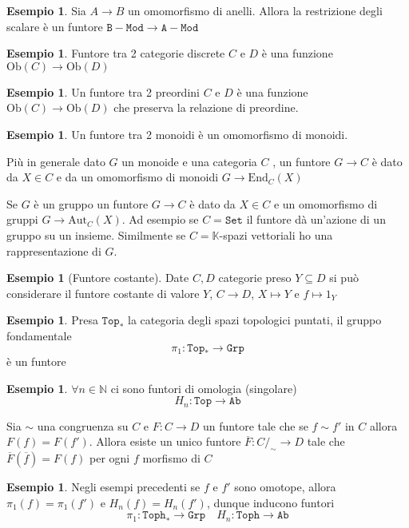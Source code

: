 \documentclass[notitlepage]{report}
\newcounter{theo}[section]\setcounter{theo}{0}
\newcounter{excounter}[section]\setcounter{excounter}{0}
\numberwithin{equation}{section}
\theoremstyle{plain}
\theoremstyle{definition}
\newtheorem{example}[excounter]{Esempio}
\theoremstyle{remark}
\begin{document}
\begin{example}{}
    Sia \(A \to B\) un omomorfismo di anelli. Allora la restrizione degli
    scalare è un funtore \(\mathtt{B-Mod} \to \mathtt{A-Mod}\) 
\end{example}


\begin{example}{}
    Funtore tra 2 categorie discrete \(C\) e \(D\) è una funzione \(\mathrm{Ob}{(C)} \to \mathrm{Ob}{(D)}\) 
\end{example}

\begin{example}{}
    Un funtore tra 2 preordini \(C\) e \(D\) è una funzione \(\mathrm{Ob}{(C)} \to \mathrm{Ob}{(D)}\)  che preserva la relazione di preordine.
\end{example}

\begin{example}{}
    Un funtore tra 2 monoidi è un omomorfismo di monoidi.

    Più in generale dato \(G\)  un monoide e una categoria \(C\) , un funtore \(G \to C\) è dato da \(X \in C\) e da un omomorfismo di monoidi \(G \to \mathrm{End}_C{(X)}\) 

    Se \(G\) è un gruppo un funtore \(G \to C\) è dato da \(X \in C\) e un
    omomorfismo di gruppi \(G \to \mathrm{Aut}_C{(X)}\). Ad esempio se \(C = \mathtt{Set}\) il funtore dà un'azione di un gruppo su un insieme.
    Similmente se \(C = \mathbb{K}\)-spazi vettoriali ho una rappresentazione di
    \(G\).
\end{example}

\begin{example}[Funtore costante]
    Date \(C, D\) categorie preso \(Y \subseteq D \) si può considerare il
    funtore costante di valore \(Y\), \(C \to D\), \(X \mapsto Y\) e \(f \mapsto 1_Y\) 
\end{example}

\begin{example}{}
    Presa \(\mathtt{Top}_*\) la categoria degli spazi topologici puntati, il
    gruppo fondamentale 
    \[
        \pi_{1} : \mathtt{Top}_* \to \mathtt{Grp}
    \]
    è un funtore
\end{example}

\begin{example}{}
    \(\forall n \in \mathbb{N}\) ci sono funtori di omologia (singolare)
    \[
      H_{n} : \mathtt{Top} \to \mathtt{Ab}
    \]
\end{example}
\begin{theorem}[Omomorfismo]
    Sia \(\sim \) una congruenza su \(C\) e \(F : C \to D\) un funtore tale che
    se \(f \sim f'\) in \(C\) allora \(F{(f)} = F{(f')}\).
    Allora esiste un unico funtore \(\overline{F} : C /_\sim \to D\) tale
    che \(\overline{F}{(\overline{f})} = F{(f)}\) per ogni \(f\) morfismo di \(C\) 
\end{theorem}
\begin{example}{}
    Negli esempi precedenti se \(f\) e \(f'\) sono omotope, allora \(\pi_{1}{(f)} = \pi_{1}{(f')}\) e \(H_{n}{(f)} = H_{n}{(f')}\), dunque inducono funtori
    \[
      \pi_{1} : \mathtt{Toph}_* \to \mathtt{Grp} \quad H_{n} : \mathtt{Toph} \to \mathtt{Ab}
    \]
\end{example}
\end{document}
